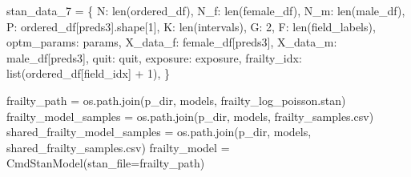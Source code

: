 \documentclass[
  letterpaper,
  DIV=11,
  numbers=noendperiod]{scrartcl}
\newenvironment{Shaded}{\begin{snugshade}}{\end{snugshade}}
\newcommand{\BuiltInTok}[1]{\textcolor[rgb]{0.00,0.23,0.31}{#1}}
\newcommand{\DecValTok}[1]{\textcolor[rgb]{0.68,0.00,0.00}{#1}}
\newcommand{\NormalTok}[1]{\textcolor[rgb]{0.00,0.23,0.31}{#1}}
\newcommand{\OperatorTok}[1]{\textcolor[rgb]{0.37,0.37,0.37}{#1}}
\newcommand{\StringTok}[1]{\textcolor[rgb]{0.13,0.47,0.30}{#1}}
\begin{document}
\begin{Shaded}
\begin{Highlighting}[]
\NormalTok{stan\_data\_7 }\OperatorTok{=}\NormalTok{ \{}
    \StringTok{\textquotesingle{}N\textquotesingle{}}\NormalTok{: }\BuiltInTok{len}\NormalTok{(ordered\_df),}
    \StringTok{\textquotesingle{}N\_f\textquotesingle{}}\NormalTok{: }\BuiltInTok{len}\NormalTok{(female\_df),}
    \StringTok{\textquotesingle{}N\_m\textquotesingle{}}\NormalTok{: }\BuiltInTok{len}\NormalTok{(male\_df),}
    \StringTok{\textquotesingle{}P\textquotesingle{}}\NormalTok{: ordered\_df[preds3].shape[}\DecValTok{1}\NormalTok{],}
    \StringTok{\textquotesingle{}K\textquotesingle{}}\NormalTok{: }\BuiltInTok{len}\NormalTok{(intervals),}
    \StringTok{\textquotesingle{}G\textquotesingle{}}\NormalTok{: }\DecValTok{2}\NormalTok{,}
    \StringTok{\textquotesingle{}F\textquotesingle{}}\NormalTok{: }\BuiltInTok{len}\NormalTok{(field\_labels),}
    \StringTok{\textquotesingle{}optm\_params\textquotesingle{}}\NormalTok{: params,}
    \StringTok{\textquotesingle{}X\_data\_f\textquotesingle{}}\NormalTok{: female\_df[preds3],}
    \StringTok{\textquotesingle{}X\_data\_m\textquotesingle{}}\NormalTok{: male\_df[preds3],}
    \StringTok{\textquotesingle{}quit\textquotesingle{}}\NormalTok{: quit,}
    \StringTok{\textquotesingle{}exposure\textquotesingle{}}\NormalTok{: exposure,}
    \StringTok{\textquotesingle{}frailty\_idx\textquotesingle{}}\NormalTok{: }\BuiltInTok{list}\NormalTok{(ordered\_df[}\StringTok{\textquotesingle{}field\_idx\textquotesingle{}}\NormalTok{] }\OperatorTok{+} \DecValTok{1}\NormalTok{),}
\NormalTok{\}}
\end{Highlighting}
\end{Shaded}

\begin{Shaded}
\begin{Highlighting}[]
\NormalTok{frailty\_path }\OperatorTok{=}\NormalTok{ os.path.join(p\_dir, }\StringTok{\textquotesingle{}models\textquotesingle{}}\NormalTok{, }\StringTok{\textquotesingle{}frailty\_log\_poisson.stan\textquotesingle{}}\NormalTok{)}
\NormalTok{frailty\_model\_samples }\OperatorTok{=}\NormalTok{ os.path.join(p\_dir, }\StringTok{\textquotesingle{}models\textquotesingle{}}\NormalTok{, }\StringTok{\textquotesingle{}frailty\_samples.csv\textquotesingle{}}\NormalTok{)}
\NormalTok{shared\_frailty\_model\_samples }\OperatorTok{=}\NormalTok{ os.path.join(p\_dir, }\StringTok{\textquotesingle{}models\textquotesingle{}}\NormalTok{, }\StringTok{\textquotesingle{}shared\_frailty\_samples.csv\textquotesingle{}}\NormalTok{)}
\NormalTok{frailty\_model }\OperatorTok{=}\NormalTok{ CmdStanModel(stan\_file}\OperatorTok{=}\NormalTok{frailty\_path)}
\end{Highlighting}
\end{Shaded}
\end{document}
